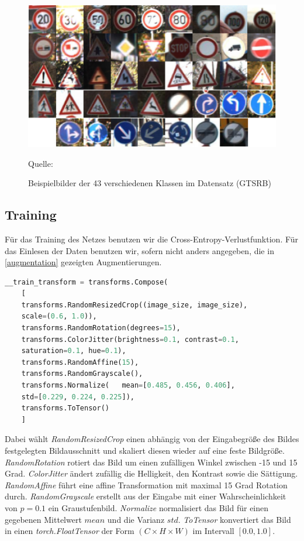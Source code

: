 \documentclass[twoside, 12pt,a4paper]{book}
\newcommand{\source}[1]{\caption*{\hfill Quelle: {#1}} }
\numberwithin{equation}{section}
\begin{document}
	\begin{figure}[ht]
		\centering
		\includegraphics[width=0.6\textheight]{gtsrb_overview.png}
		
		\caption{Beispielbilder der 43 verschiedenen Klassen im Datensatz (GTSRB)}
		\source{\cite{GTSRB_dataset}}
		\label{im:dataset}
	\end{figure}
	
	
	
	\subsection{Training}
	Für das Training des Netzes benutzen wir die Cross-Entropy-Verlustfunktion. Für das Einlesen der Daten benutzen wir, sofern nicht anders angegeben, die in \autoref{augmentation} gezeigten Augmentierungen.
	
	\begin{lstlisting}[language=Python, caption=Augmentierung beim Einlesen der Daten, label=augmentation]
	__train_transform = transforms.Compose(
	[
	transforms.RandomResizedCrop((image_size, image_size), 
	scale=(0.6, 1.0)),
	transforms.RandomRotation(degrees=15),
	transforms.ColorJitter(brightness=0.1, contrast=0.1, 
	saturation=0.1, hue=0.1),
	transforms.RandomAffine(15),
	transforms.RandomGrayscale(),
	transforms.Normalize(	mean=[0.485, 0.456, 0.406], 
	std=[0.229, 0.224, 0.225]),
	transforms.ToTensor()
	]
	\end{lstlisting}
	Dabei wählt \textit{RandomResizedCrop} einen abhängig von der Eingabegröße des Bildes festgelegten Bildausschnitt und skaliert diesen wieder auf eine feste Bildgröße. \textit{RandomRotation} rotiert das Bild um einen zufälligen Winkel zwischen -15 und 15 Grad. \textit{ColorJitter} ändert zufällig
	die Helligkeit, den Kontrast sowie die Sättigung. \textit{RandomAffine} führt eine affine Transformation mit maximal 15 Grad Rotation durch. \textit{RandomGrayscale}
	erstellt aus der Eingabe mit einer Wahrscheinlichkeit von $p = 0.1$ ein Graustufenbild. \textit{Normalize} normalisiert das Bild für einen gegebenen Mittelwert $mean$ und die Varianz $std$. \textit{ToTensor} konvertiert das Bild in einen \textit{torch.FloatTensor} der Form $(C
	\times H \times W)$ im Intervall $[0.0, 1.0]$.
	
\end{document}
